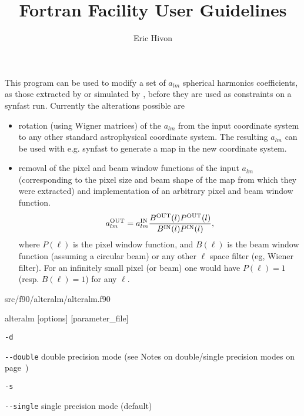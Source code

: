 
\sloppy


\title{\healpix Fortran Facility User Guidelines}
 \section[alteralm]{\nosectionname}
\label{fac:alteralm}
\author{Eric Hivon}

\begin{facility}
{This program can be used to modify a set of $a_{lm}$ spherical harmonics
  coefficients, as those extracted by  or 
  simulated by , before
  they are used as constraints on a synfast run. Currently the alterations
  possible are %
\begin{itemize}
    \item rotation (using Wigner matrices) of the $a_{lm}$ from the input
    coordinate system to any other standard astrophysical coordinate system. The
    resulting $a_{lm}$ can be used with e.g. synfast to generate a map in the
    new coordinate system.
    \item removal of the pixel and beam window functions of the input
  $a_{lm}$ (corresponding to the pixel size and beam shape of the map from which
  they were extracted) and implementation of an arbitrary pixel and beam window
  function.
 \begin{equation} a_{\ell m}^{\rm OUT} = a_{\ell m}^{\rm IN} \frac{B^{\rm OUT}(\ell) P^{\rm 
 OUT}(\ell)}{B^{\rm IN}(\ell) P^{\rm IN}(\ell)}, \label{eq:alteralm} \end{equation}
where $P(\ell)$ is the pixel window function, and $B(\ell)$ is the beam window
 function (assuming a circular beam) or any other $\ell$ space filter (eg,
 Wiener filter). For an infinitely small pixel (or beam) one would have $P(\ell) =
 1$ (resp. $B(\ell) = 1$) for any $\ell$.
\end{itemize}%
}%
{src/f90/alteralm/alteralm.f90}
\end{facility}

\begin{f90facility}
{alteralm [options] [parameter\_file]}
\end{f90facility}

\begin{options}
  \begin{optionlistwide}{} %
    \item[{\tt -d}]
    \item[{\tt -}{\tt -}{\tt double}] double precision mode (see Notes on double/single precision modes on page~\pageref{page:ioprec})
    \item[{\tt -s}]
    \item[{\tt -}{\tt -}{\tt single}] single precision mode (default)
  \end{optionlistwide}
\end{options}

